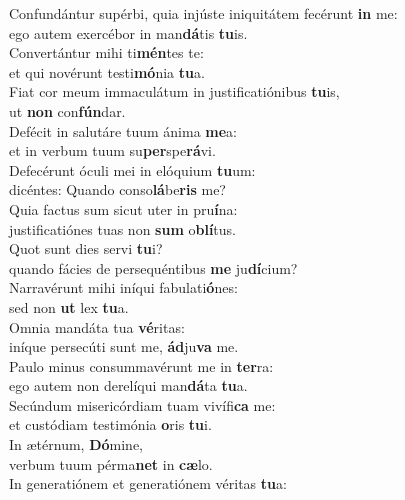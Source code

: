 \evenverse Confundántur supérbi, quia injúste iniquitátem fecérunt \textbf{in} me:~\*\\
\evenverse ego autem exercébor in man\textbf{dá}tis \textbf{tu}is.\\
\oddverse Convertántur mihi ti\textbf{mén}tes te:~\*\\
\oddverse et qui novérunt testi\textbf{mó}nia \textbf{tu}a.\\
\evenverse Fiat cor meum immaculátum in justificatiónibus \textbf{tu}is,~\*\\
\evenverse ut \textbf{non} con\textbf{fún}dar.\\
\oddverse Defécit in salutáre tuum ánima \textbf{me}a:~\*\\
\oddverse et in verbum tuum su\textbf{per}spe\textbf{rá}vi.\\
\evenverse Defecérunt óculi mei in elóquium \textbf{tu}um:~\*\\
\evenverse dicéntes: Quando conso\textbf{lá}be\textbf{ris} me?\\
\oddverse Quia factus sum sicut uter in pru\textbf{í}na:~\*\\
\oddverse justificatiónes tuas non \textbf{sum} o\textbf{blí}tus.\\
\evenverse Quot sunt dies servi \textbf{tu}i?~\*\\
\evenverse quando fácies de persequéntibus \textbf{me} ju\textbf{dí}cium?\\
\oddverse Narravérunt mihi iníqui fabulati\textbf{ó}nes:~\*\\
\oddverse sed non \textbf{ut} lex \textbf{tu}a.\\
\evenverse Omnia mandáta tua \textbf{vé}ritas:~\*\\
\evenverse iníque persecúti sunt me, \textbf{ád}ju\textbf{va} me.\\
\oddverse Paulo minus consummavérunt me in \textbf{ter}ra:~\*\\
\oddverse ego autem non derelíqui man\textbf{dá}ta \textbf{tu}a.\\
\evenverse Secúndum misericórdiam tuam vivífi\textbf{ca} me:~\*\\
\evenverse et custódiam testimónia \textbf{o}ris \textbf{tu}i.\\
\oddverse In ætérnum, \textbf{Dó}mine,~\*\\
\oddverse verbum tuum pérma\textbf{net} in \textbf{cæ}lo.\\
\evenverse In generatiónem et generatiónem véritas \textbf{tu}a:~\*\\
